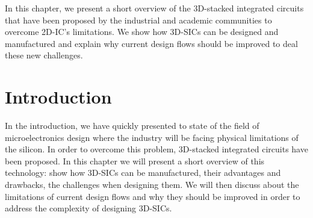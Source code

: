 \label{cha:rol.icdesign}

\begin{summary}
In this chapter, we present a short overview of the 3D-stacked integrated circuits that have been proposed by the industrial and academic communities to overcome 2D-IC's limitations. We show how 3D-SICs can be designed and manufactured and explain why current design flows should be improved to deal these new challenges.
\end{summary}

\section{Introduction}
In the introduction, we have quickly presented to state of the field of microelectronics design where the industry will be facing physical limitations of the silicon. In order to overcome this problem, 3D-stacked integrated circuits have been proposed. In this chapter we will present a short overview of this technology: show how 3D-SICs can be manufactured, their advantages and drawbacks, the challenges when designing them. We will then discuss about the limitations of current design flows and why they should be improved in order to address the complexity of designing 3D-SICs.
%
%
%
